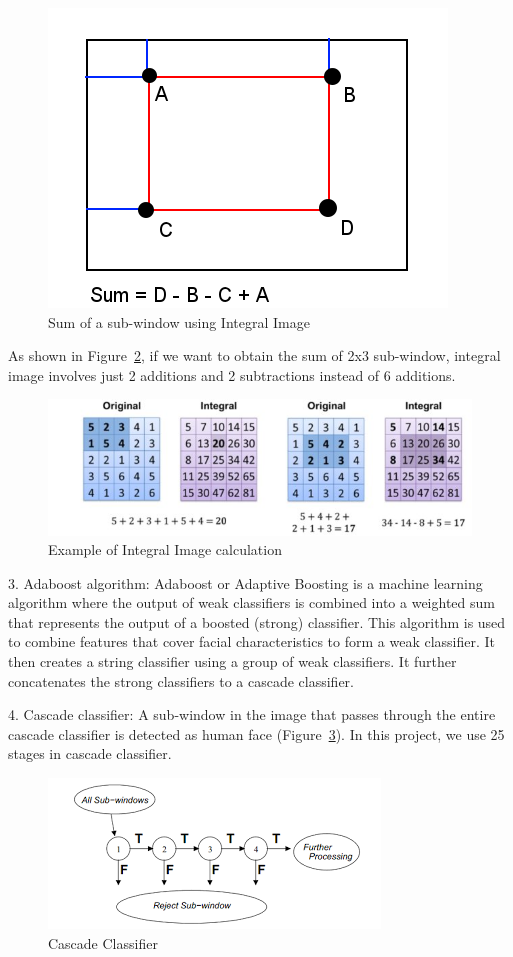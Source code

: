 \begin{figure}[h]
  \includegraphics[width=0.45\linewidth]{figs/sum.png}
  \caption{Sum of a sub-window using Integral Image \textnormal{\small }  }
  \label{fig:sum}
\end{figure}

As shown in Figure~\ref{fig:example}, if we want to obtain the sum of 2x3 sub-window, 
integral image involves just 2 additions and 2 subtractions instead of 6 additions.

\begin{figure}[h]
  \includegraphics[width=0.45\linewidth]{figs/example.jpg}
  \caption{Example of Integral Image calculation \textnormal{\small }  }
  \label{fig:example}
\end{figure}

3. Adaboost algorithm: Adaboost or Adaptive Boosting is a machine learning algorithm 
where the output of weak classifiers is combined into a weighted sum that represents the output 
of a boosted (strong) classifier. This algorithm is used to combine features that cover facial 
characteristics to form a weak classifier. It then creates a string classifier using a group 
of weak classifiers. It further concatenates the strong classifiers to a cascade classifier.

4. Cascade classifier: A sub-window in the image that passes through the entire cascade 
classifier is detected as human face (Figure~\ref{fig:cascade}). In this project, we use 25 stages in cascade classifier. 
\begin{figure}
  \includegraphics[width=0.9\linewidth]{figs/cascade.png}
  \caption{Cascade Classifier \textnormal{\small }  }
  \label{fig:cascade}
\end{figure}

